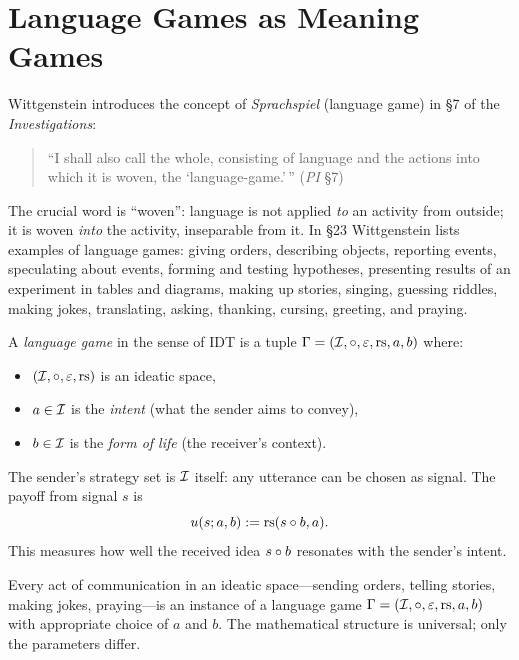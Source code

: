 \section{Language Games as Meaning Games}

Wittgenstein introduces the concept of \emph{Sprachspiel} (language game) in
\S7 of the \emph{Investigations}:
\begin{quote}
``I shall also call the whole, consisting of language and the actions into
which it is woven, the `language-game.'\,'' (\emph{PI} \S7)
\end{quote}
The crucial word is ``woven'': language is not applied \emph{to} an activity
from outside; it is woven \emph{into} the activity, inseparable from it. In
\S23 Wittgenstein lists examples of language games: giving orders, describing
objects, reporting events, speculating about events, forming and testing
hypotheses, presenting results of an experiment in tables and diagrams,
making up stories, singing, guessing riddles, making jokes, translating,
asking, thanking, cursing, greeting, and praying.

\begin{definition}
\label{def:language-game-formal}
A \emph{language game} in the sense of IDT is a tuple
$\Gamma = (\mathcal{I}, \circ, \varepsilon, \mathrm{rs}, a, b)$ where:
\begin{itemize}
\item $(\mathcal{I}, \circ, \varepsilon, \mathrm{rs})$ is an ideatic space,
\item $a \in \mathcal{I}$ is the \emph{intent} (what the sender aims to convey),
\item $b \in \mathcal{I}$ is the \emph{form of life} (the receiver's context).
\end{itemize}
The sender's strategy set is $\mathcal{I}$ itself: any utterance can be chosen as
signal. The payoff from signal $s$ is
\[
  u(s; a, b) := \mathrm{rs}(s \circ b, a).
\]
This measures how well the received idea $s \circ b$ resonates with the
sender's intent.
\end{definition}

\begin{theorem}
\label{thm:universality}
Every act of communication in an ideatic space---sending orders, telling
stories, making jokes, praying---is an instance of a language game
$\Gamma = (\mathcal{I}, \circ, \varepsilon, \mathrm{rs}, a, b)$ with appropriate choice of
$a$ and $b$. The mathematical structure is universal; only the parameters
differ.
\end{theorem}

